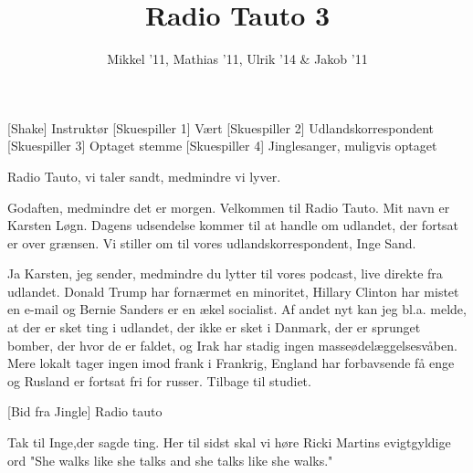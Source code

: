 \documentclass[a4paper,11pt]{article}
\title{Radio Tauto 3}
\author{Mikkel '11, Mathias '11, Ulrik '14 \& Jakob '11}
\begin{document}
\maketitle

\begin{roles}
[Shake] Instruktør
[Skuespiller 1] Vært
[Skuespiller 2] Udlandskorrespondent
[Skuespiller 3] Optaget stemme %
[Skuespiller 4] Jinglesanger, muligvis optaget
\end{roles}


\begin{sketch}



 Radio Tauto, vi taler sandt, medmindre vi lyver.

 Godaften, medmindre det er morgen. Velkommen til Radio Tauto. Mit navn er Karsten Løgn. Dagens udsendelse kommer til at handle om udlandet, der fortsat er over grænsen. Vi stiller om til vores udlandskorrespondent, Inge Sand.

 Ja Karsten, jeg sender, medmindre du lytter til vores podcast, live direkte fra udlandet.  Donald Trump har fornærmet en minoritet, Hillary Clinton har mistet en e-mail og Bernie Sanders er en ækel socialist. Af andet nyt kan jeg bl.a. melde, at der er sket ting i udlandet, der ikke er sket i Danmark, der er sprunget bomber, der hvor de er faldet, og Irak har stadig ingen masseødelæggelsesvåben. Mere lokalt tager ingen imod frank i Frankrig, England har forbavsende få enge og Rusland er fortsat fri for russer. Tilbage til studiet.

[Bid fra Jingle] Radio tauto

 Tak til Inge,der sagde ting. Her til sidst skal vi høre Ricki Martins evigtgyldige ord "She walks like she talks and she talks like she walks."


\end{sketch}
\end{document}
